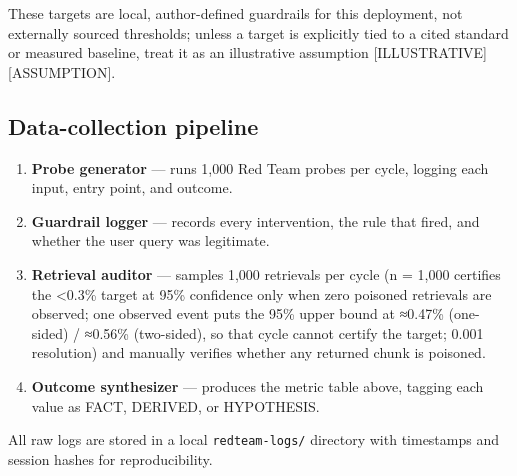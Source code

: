 These targets are local, author-defined guardrails for this deployment,
not externally sourced thresholds; unless a target is explicitly tied to
a cited standard or measured baseline, treat it as an illustrative
assumption \mbox{{[}ILLUSTRATIVE{]}}\hspace{0pt}\mbox{{[}ASSUMPTION{]}}.

\subsection{Data-collection pipeline}\label{data-collection-pipeline}

\begin{enumerate}
\def\labelenumi{\arabic{enumi}.}
\tightlist
\item
  \textbf{Probe generator} --- runs 1,000 Red Team probes per cycle,
  logging each input, entry point, and outcome.
\item
  \textbf{Guardrail logger} --- records every intervention, the rule
  that fired, and whether the user query was legitimate.
\item
  \textbf{Retrieval auditor} --- samples 1,000 retrievals per cycle (n =
  1,000 certifies the \textless0.3\% target at 95\% confidence only when
  zero poisoned retrievals are observed; one observed event puts the
  95\% upper bound at ≈0.47\% (one-sided) / ≈0.56\% (two-sided), so that
  cycle cannot certify the target; 0.001 resolution) and manually
  verifies whether any returned chunk is poisoned.
\item
  \textbf{Outcome synthesizer} --- produces the metric table above,
  tagging each value as FACT, DERIVED, or HYPOTHESIS.
\end{enumerate}

All raw logs are stored in a local \texttt{redteam-logs/} directory with
timestamps and session hashes for reproducibility.

\label{common-mistakes}


